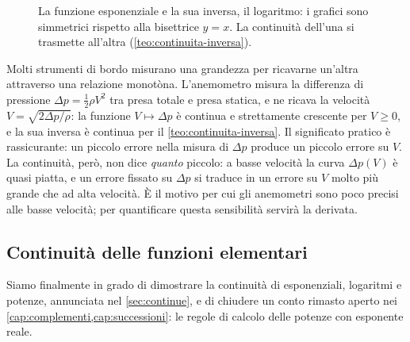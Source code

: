 \begin{figure}[htb]
\centering
{}
\caption{La funzione esponenziale e la sua inversa, il logaritmo: i grafici sono
simmetrici rispetto alla bisettrice $y=x$. La continuità dell'una si trasmette all'altra
(\cref{teo:continuita-inversa}).}
\label{fig:inversa-continua}
\end{figure}

\begin{idea}
Molti strumenti di bordo misurano una grandezza per ricavarne un'altra attraverso una
relazione monotòna. L'anemometro misura la differenza di pressione
$\Delta p=\frac12\rho V^{2}$ tra presa totale e presa statica, e ne ricava la velocità
$V=\sqrt{2\Delta p/\rho}$: la funzione $V\mapsto\Delta p$ è continua e strettamente
crescente per $V\ge0$, e la sua inversa è continua per il \cref{teo:continuita-inversa}.
Il significato pratico è rassicurante: un piccolo errore nella misura di $\Delta p$
produce un piccolo errore su $V$. La continuità, però, non dice \emph{quanto} piccolo:
a basse velocità la curva $\Delta p(V)$ è quasi piatta, e un errore fissato su $\Delta p$
si traduce in un errore su $V$ molto più grande che ad alta velocità. È il motivo per cui
gli anemometri sono poco precisi alle basse velocità; per quantificare questa
sensibilità servirà la derivata.
\end{idea}

\subsection{Continuità delle funzioni elementari}

Siamo finalmente in grado di dimostrare la continuità di esponenziali, logaritmi e
potenze, annunciata nel \cref{sec:continue}, e di chiudere un conto rimasto aperto nei
\cref{cap:complementi,cap:successioni}: le regole di calcolo delle potenze con
esponente reale.

